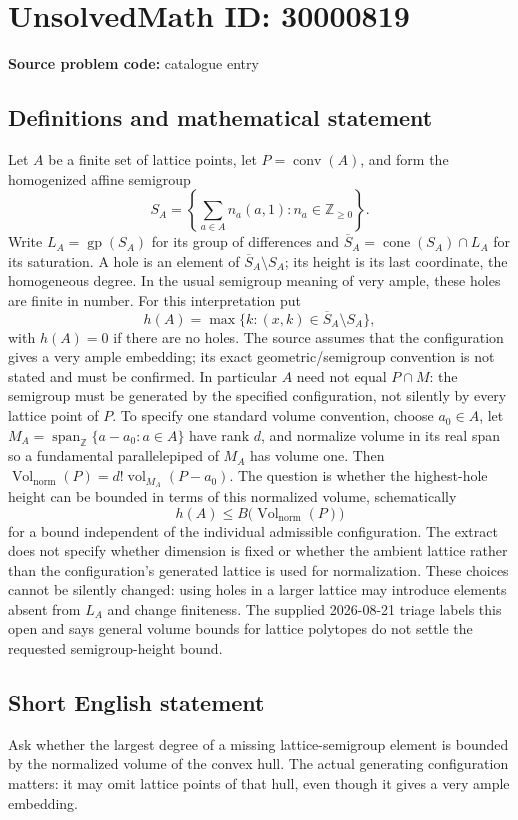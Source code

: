 \documentclass[11pt]{article}
\newcommand{\Z}{\mathbb{Z}}
\begin{document}
\section*{UnsolvedMath ID: 30000819}
\textbf{Source problem code:} catalogue entry
\subsection{Definitions and mathematical statement}
Let $A$ be a finite set of lattice points, let $P=\operatorname{conv}(A)$, and form the homogenized affine semigroup \[S_A=\left\{\sum_{a\in A}n_a(a,1):n_a\in\Z_{\geq0}\right\}.\] Write $L_A=\operatorname{gp}(S_A)$ for its group of differences and $\overline S_A=\operatorname{cone}(S_A)\cap L_A$ for its saturation. A hole is an element of $\overline S_A\setminus S_A$; its height is its last coordinate, the homogeneous degree. In the usual semigroup meaning of very ample, these holes are finite in number. For this interpretation put \[h(A)=\max\{k:(x,k)\in\overline S_A\setminus S_A\},\] with $h(A)=0$ if there are no holes. The source assumes that the configuration gives a very ample embedding; its exact geometric/semigroup convention is not stated and must be confirmed. In particular $A$ need not equal $P\cap M$: the semigroup must be generated by the specified configuration, not silently by every lattice point of $P$. To specify one standard volume convention, choose $a_0\in A$, let $M_A=\operatorname{span}_{\Z}\{a-a_0:a\in A\}$ have rank $d$, and normalize volume in its real span so a fundamental parallelepiped of $M_A$ has volume one. Then $\operatorname{Vol}_{\mathrm{norm}}(P)=d!\operatorname{vol}_{M_A}(P-a_0)$. The question is whether the highest-hole height can be bounded in terms of this normalized volume, schematically \[h(A)\leq B\bigl(\operatorname{Vol}_{\mathrm{norm}}(P)\bigr)\] for a bound independent of the individual admissible configuration. The extract does not specify whether dimension is fixed or whether the ambient lattice rather than the configuration's generated lattice is used for normalization. These choices cannot be silently changed: using holes in a larger lattice may introduce elements absent from $L_A$ and change finiteness. The supplied 2026-08-21 triage labels this open and says general volume bounds for lattice polytopes do not settle the requested semigroup-height bound.
\subsection{Short English statement}
Ask whether the largest degree of a missing lattice-semigroup element is bounded by the normalized volume of the convex hull. The actual generating configuration matters: it may omit lattice points of that hull, even though it gives a very ample embedding.
\end{document}
